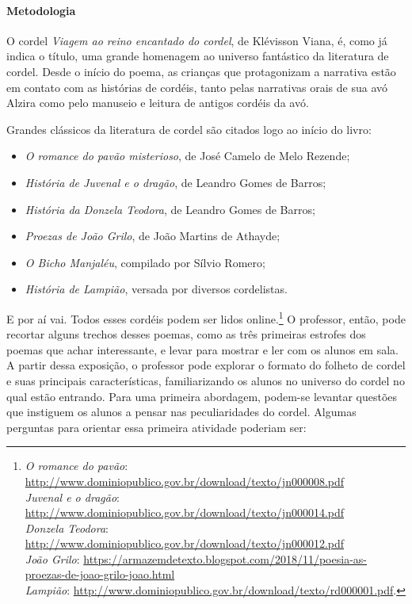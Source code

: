 \documentclass[11pt]{extarticle}
\begin{document}
\paragraph{Metodologia} O cordel \textit{Viagem ao reino encantado do cordel}, de Klévisson Viana, é, como já indica o título, uma grande homenagem ao universo fantástico da literatura de cordel. Desde o início do poema, as crianças que protagonizam a narrativa estão em contato com as histórias de cordéis, tanto pelas narrativas orais de sua avó Alzira como pelo manuseio e leitura de antigos cordéis da avó.

Grandes clássicos da literatura de cordel são citados logo ao início do livro:

\begin{itemize}
\item \textit{O romance do pavão misterioso}, de José Camelo de Melo Rezende;

\item \textit{História de Juvenal e o dragão}, de Leandro Gomes de Barros;

\item \textit{História da Donzela Teodora}, de Leandro Gomes de Barros;

\item \textit{Proezas de João Grilo}, de João Martins de Athayde;

\item \textit{O Bicho Manjaléu}, compilado por Sílvio Romero;

\item \textit{História de Lampião}, versada por diversos cordelistas.
\end{itemize}

E por aí vai. Todos esses cordéis podem ser lidos
online.\footnote{\textit{O romance do pavão}: \url{http://www.dominiopublico.gov.br/download/texto/jn000008.pdf}\\
\textit{Juvenal e o dragão}: \url{http://www.dominiopublico.gov.br/download/texto/jn000014.pdf}\\
\textit{Donzela Teodora}: \url{http://www.dominiopublico.gov.br/download/texto/jn000012.pdf}\\
\textit{João Grilo}: \url{https://armazemdetexto.blogspot.com/2018/11/poesia-as-proezas-de-joao-grilo-joao.html}\\
\textit{Lampião}: \url{http://www.dominiopublico.gov.br/download/texto/rd000001.pdf}.}
O professor, então, pode recortar alguns trechos desses poemas, como as três primeiras estrofes dos poemas que achar interessante, e levar para mostrar e ler com os alunos em sala.
A partir dessa exposição, o professor pode explorar o formato do folheto de cordel e suas principais características, familiarizando os alunos no universo do cordel no qual estão entrando. 
Para uma primeira abordagem, podem-se levantar questões que instiguem os alunos a pensar nas peculiaridades do cordel.
Algumas perguntas para orientar essa primeira atividade poderiam ser:
\end{document}

